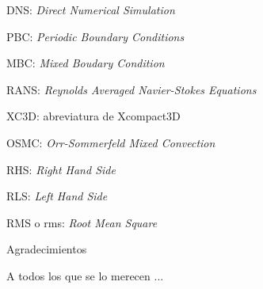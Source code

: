 \documentclass[12pt,screen,twoside]{ibtesis}
\begin{document}
\begin{preliminary}
\begin{abreviaturas}
\begin{itemize}
{%
\item[] DNS: \textit{Direct Numerical Simulation}
\item[] PBC: \textit{Periodic Boundary Conditions} 
\item[] MBC: \textit{Mixed Boudary Condition}
\item[] RANS: \textit{Reynolds Averaged Navier-Stokes Equations}
\item[] XC3D: abreviatura de Xcompact3D
\item[] OSMC: \textit{Orr-Sommerfeld Mixed Convection}
\item[] RHS: \textit{Right Hand Side}
\item[] RLS: \textit{Left Hand Side}
\item[] RMS o rms: \textit{Root Mean Square}

}
\end{itemize}
\end{abreviaturas}

\tableofcontents                %




\end{preliminary}









%
\appendix







\begin{postliminary}


\begin{seccion}{Agradecimientos}
 
A todos los que se lo merecen ...
\end{seccion}

\end{postliminary}
\end{document}
